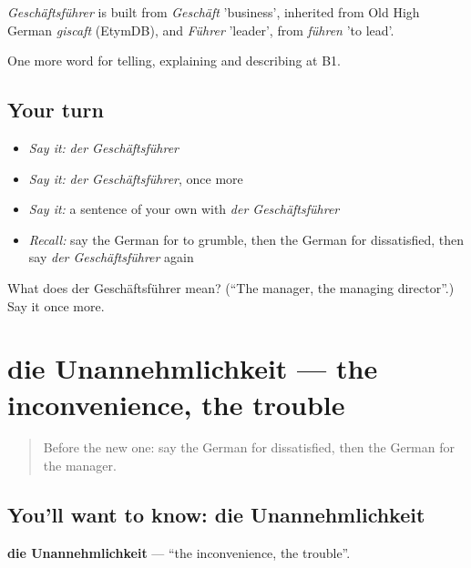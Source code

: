 \begin{cousinweb}
\emph{Geschäftsführer} is built from \emph{Geschäft} 'business', inherited from Old High German \emph{giscaft} (EtymDB), and \emph{Führer} 'leader', from \emph{führen} 'to lead'.
\end{cousinweb}

\begin{grammarlens}[title={What you've built}]
One more word for telling, explaining and describing at B1.
\end{grammarlens}

\subsection*{Your turn}
\begin{itemize}
\raggedright
  \item \emph{Say it:} \emph{der Geschäftsführer}
  \item \emph{Say it:} \emph{der Geschäftsführer}, once more
  \item \emph{Say it:} a sentence of your own with \emph{der Geschäftsführer}
  \item \emph{Recall:} say the German for to grumble, then the German for dissatisfied, then say \emph{der Geschäftsführer} again
\end{itemize}

\begin{tcolorbox}[breakable,colback=teal!4,colframe=teal!35!black,title={Before you move on}]
What does der Geschäftsführer mean? (\textquotedblleft{}The manager, the managing director\textquotedblright{}.) Say it once more.
\end{tcolorbox}
\section[die Unannehmlichkeit]{die Unannehmlichkeit — the inconvenience, the trouble}

\label{lesson:GE-C432-unannehmlichkeit}



\begin{quote}
Before the new one: say the German for dissatisfied, then the German for the manager.
\end{quote}

\subsection*{You'll want to know: die Unannehmlichkeit}
\textbf{die Unannehmlichkeit} — \textquotedblleft{}the inconvenience, the trouble\textquotedblright{}.

